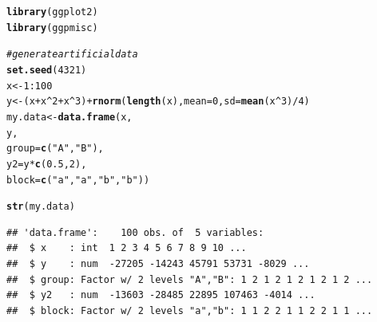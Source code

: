 \documentclass{article}\usepackage[]{graphicx}\usepackage[]{color}
\makeatletter
\newcommand{\hlnum}[1]{\textcolor[rgb]{0.686,0.059,0.569}{#1}}%
\newcommand{\hlstr}[1]{\textcolor[rgb]{0.192,0.494,0.8}{#1}}%
\newcommand{\hlcom}[1]{\textcolor[rgb]{0.678,0.584,0.686}{\textit{#1}}}%
\newcommand{\hlopt}[1]{\textcolor[rgb]{0,0,0}{#1}}%
\newcommand{\hlstd}[1]{\textcolor[rgb]{0.345,0.345,0.345}{#1}}%
\newcommand{\hlkwb}[1]{\textcolor[rgb]{0.69,0.353,0.396}{#1}}%
\newcommand{\hlkwc}[1]{\textcolor[rgb]{0.333,0.667,0.333}{#1}}%
\newcommand{\hlkwd}[1]{\textcolor[rgb]{0.737,0.353,0.396}{\textbf{#1}}}%
\newenvironment{kframe}{%
 \def\at@end@of@kframe{}%
 \ifinner\ifhmode%
  \def\at@end@of@kframe{\end{minipage}}%
  \begin{minipage}{\columnwidth}%
 \fi\fi%
 \def\FrameCommand##1{\hskip\@totalleftmargin \hskip-\fboxsep
 \colorbox{shadecolor}{##1}\hskip-\fboxsep
     \hskip-\linewidth \hskip-\@totalleftmargin \hskip\columnwidth}%
 \MakeFramed {\advance\hsize-\width
   \@totalleftmargin\z@ \linewidth\hsize
   \@setminipage}}%
 {\par\unskip\endMakeFramed%
 \at@end@of@kframe}
\newenvironment{knitrout}{}{} %
\makeatother
\begin{document}
\begin{knitrout}\footnotesize
{}\color{fgcolor}\begin{kframe}
\begin{alltt}
\hlkwd{library}\hlstd{(ggplot2)}
\hlkwd{library}\hlstd{(ggpmisc)}
\end{alltt}
\end{kframe}
\end{knitrout}

\begin{knitrout}\footnotesize
{}\color{fgcolor}\begin{kframe}
\begin{alltt}
\hlcom{# generate artificial data}
\hlkwd{set.seed}\hlstd{(}\hlnum{4321}\hlstd{)}
\hlstd{x} \hlkwb{<-} \hlnum{1}\hlopt{:}\hlnum{100}
\hlstd{y} \hlkwb{<-} \hlstd{(x} \hlopt{+} \hlstd{x}\hlopt{^}\hlnum{2} \hlopt{+} \hlstd{x}\hlopt{^}\hlnum{3}\hlstd{)} \hlopt{+} \hlkwd{rnorm}\hlstd{(}\hlkwd{length}\hlstd{(x),} \hlkwc{mean} \hlstd{=} \hlnum{0}\hlstd{,} \hlkwc{sd} \hlstd{=} \hlkwd{mean}\hlstd{(x}\hlopt{^}\hlnum{3}\hlstd{)} \hlopt{/} \hlnum{4}\hlstd{)}
\hlstd{my.data} \hlkwb{<-} \hlkwd{data.frame}\hlstd{(x,}
                      \hlstd{y,}
                      \hlkwc{group} \hlstd{=} \hlkwd{c}\hlstd{(}\hlstr{"A"}\hlstd{,} \hlstr{"B"}\hlstd{),}
                      \hlkwc{y2} \hlstd{= y} \hlopt{*} \hlkwd{c}\hlstd{(}\hlnum{0.5}\hlstd{,}\hlnum{2}\hlstd{),}
                      \hlkwc{block} \hlstd{=} \hlkwd{c}\hlstd{(}\hlstr{"a"}\hlstd{,} \hlstr{"a"}\hlstd{,} \hlstr{"b"}\hlstd{,} \hlstr{"b"}\hlstd{))}

\hlkwd{str}\hlstd{(my.data)}
\end{alltt}
\begin{verbatim}
## 'data.frame':	100 obs. of  5 variables:
##  $ x    : int  1 2 3 4 5 6 7 8 9 10 ...
##  $ y    : num  -27205 -14243 45791 53731 -8029 ...
##  $ group: Factor w/ 2 levels "A","B": 1 2 1 2 1 2 1 2 1 2 ...
##  $ y2   : num  -13603 -28485 22895 107463 -4014 ...
##  $ block: Factor w/ 2 levels "a","b": 1 1 2 2 1 1 2 2 1 1 ...
\end{verbatim}
\end{kframe}
\end{knitrout}
\end{document}
